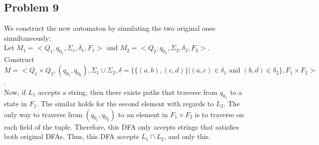 \documentclass[english]{article}
\begin{document}
\subsection*{Problem 9}
We construct the new automaton by simulating the two original ones simultaneously:\\
Let $M_1 = <Q_1, q_{0_1}, \Sigma_1, \delta_1, F_1>$ and $M_2 = <Q_2, q_{0_2}, \Sigma_2, \delta_2, F_2>$.\\
Construct $M = <Q_1 \times Q_2, (q_{0_1}, q_{0_2}), \Sigma_1 \cup \Sigma_2, \delta = \{\{(a,b), (c,d)\}|(a,c) \in \delta_1 \text{ and } (b,d) \in \delta_2\}, F_1 \times F_2>$.\\
Now, if $L_1$ accepts a string, then there exists paths that traverse from $q_{0_1}$ to a state in $F_1$. The similar holds for the second element with regards to $L_2$. The only way to traverse from $(q_{0_1}, q_{0_2})$ to an element in $F_1 \times F_2$ is to traverse on each field of the tuple. Therefore, this DFA only accepts strings that satisfies both original DFAs. Thus, this DFA accepts $L_1 \cap L_2$, and only this.
\end{document}

